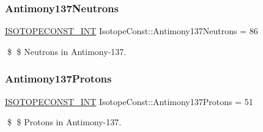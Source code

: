 \subsubsection{\texorpdfstring{Antimony137\+Neutrons}{Antimony137Neutrons}}
{\footnotesize\ttfamily \mbox{\hyperlink{group___isotope_const-_macros_ga5f18360b3e99483a35c32d789e62621c}{I\+S\+O\+T\+O\+P\+E\+C\+O\+N\+S\+T\+\_\+\+I\+NT}} Isotope\+Const\+::\+Antimony137\+Neutrons = 86}

\$ \$ Neutrons in Antimony-\/137. \mbox{\label{group___isotope_const-_antimony-_sb137_ga3c9de0082948638d7335bc848b44c174}} 
\subsubsection{\texorpdfstring{Antimony137\+Protons}{Antimony137Protons}}
{\footnotesize\ttfamily \mbox{\hyperlink{group___isotope_const-_macros_ga5f18360b3e99483a35c32d789e62621c}{I\+S\+O\+T\+O\+P\+E\+C\+O\+N\+S\+T\+\_\+\+I\+NT}} Isotope\+Const\+::\+Antimony137\+Protons = 51}

\$ \$ Protons in Antimony-\/137. 